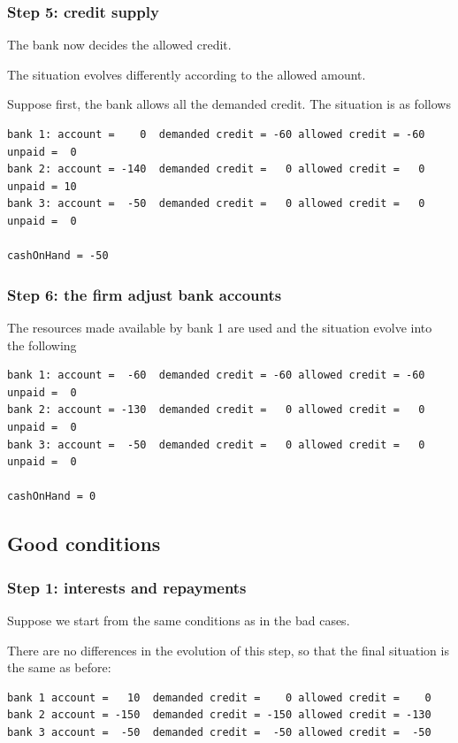\documentclass{article}
\begin{document}
\subsubsection*{Step 5: credit supply}

The bank now decides the allowed credit.

The situation evolves differently according to the allowed amount.

Suppose first, the bank allows all the demanded credit. The situation is as follows

\begin{verbatim}
bank 1: account =    0  demanded credit = -60 allowed credit = -60 unpaid =  0
bank 2: account = -140  demanded credit =   0 allowed credit =   0 unpaid = 10
bank 3: account =  -50  demanded credit =   0 allowed credit =   0 unpaid =  0

cashOnHand = -50
\end{verbatim}

\subsubsection*{Step 6: the firm adjust bank accounts}

The resources made available by bank 1 are used and the situation evolve into the following

\begin{verbatim}
bank 1: account =  -60  demanded credit = -60 allowed credit = -60 unpaid =  0
bank 2: account = -130  demanded credit =   0 allowed credit =   0 unpaid =  0
bank 3: account =  -50  demanded credit =   0 allowed credit =   0 unpaid =  0

cashOnHand = 0
\end{verbatim}

\subsection{Good conditions}
	\subsubsection*{Step 1: interests and repayments}
	Suppose we start from the same conditions as in the bad cases.

	There are no differences in the evolution of this step, so that the final situation is the same as before:
\begin{verbatim}
bank 1 account =   10  demanded credit =    0 allowed credit =    0
bank 2 account = -150  demanded credit = -150 allowed credit = -130 
bank 3 account =  -50  demanded credit =  -50 allowed credit =  -50
\end{verbatim}
\end{document}
